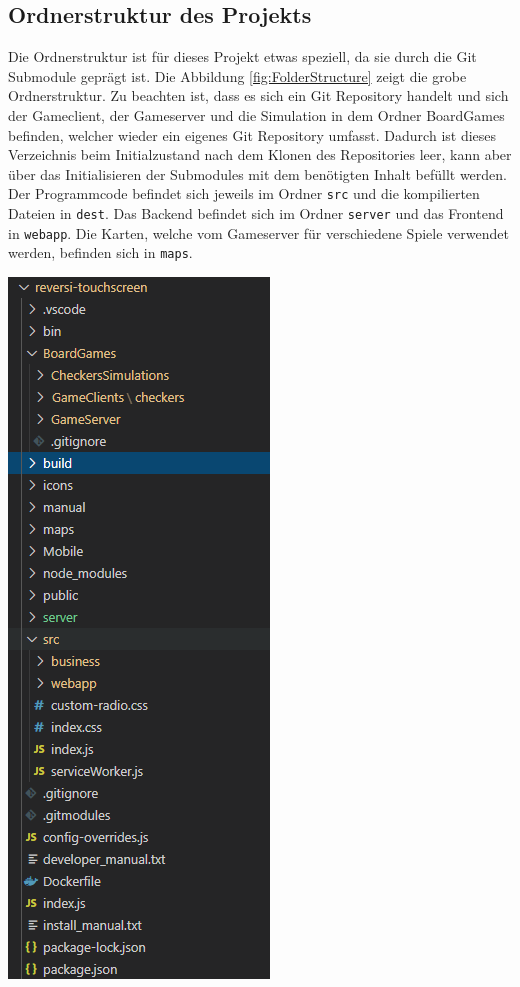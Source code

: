 \documentclass[12pt,a4paper,bibliography=totocnumbered,listof=totocnumbered]{article}
\begin{document}
\begin{appendix}
\pagebreak

\section{Ordnerstruktur des Projekts}
Die Ordnerstruktur ist für dieses Projekt etwas speziell, da sie durch die Git Submodule geprägt ist.
Die Abbildung \ref{fig:FolderStructure} zeigt die grobe Ordnerstruktur. Zu beachten ist, dass es sich ein Git Repository handelt und sich
der Gameclient, der Gameserver und die Simulation in dem Ordner BoardGames befinden, welcher wieder ein eigenes Git Repository umfasst. 
Dadurch ist dieses Verzeichnis beim Initialzustand nach dem Klonen des Repositories leer, kann aber über das Initialisieren der Submodules 
mit dem benötigten Inhalt befüllt werden. Der Programmcode befindet sich jeweils im Ordner \texttt{src} und die kompilierten Dateien 
in \texttt{dest}. Das Backend befindet sich im Ordner \texttt{server} und das Frontend in \texttt{webapp}. Die Karten, welche vom Gameserver 
für verschiedene Spiele verwendet werden, befinden sich in \texttt{maps}.

\vspace{1em}
\begin{minipage}{\linewidth}
	\centering
	\includegraphics[width=0.3\linewidth]{pics/FolderStructure.png}
    \label{fig:FolderStructure}
\end{minipage}


\pagebreak


\end{appendix}
\end{document}

